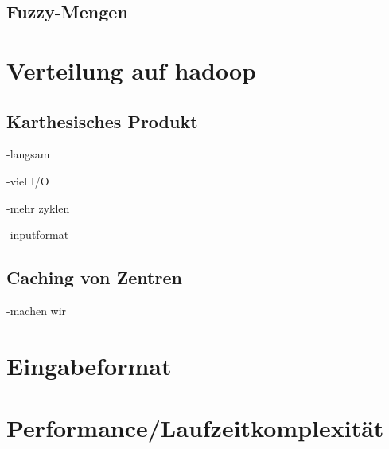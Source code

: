 \documentclass[a4paper,11pt]{article}
\begin{document}
\subsection{Fuzzy-Mengen}

\section{Verteilung auf hadoop}
\subsection{Karthesisches Produkt}
-langsam

-viel I/O

-mehr zyklen

-inputformat

\subsection{Caching von Zentren}
-machen wir

\section{Eingabeformat}

\section{Performance/Laufzeitkomplexität}
\end{document}

